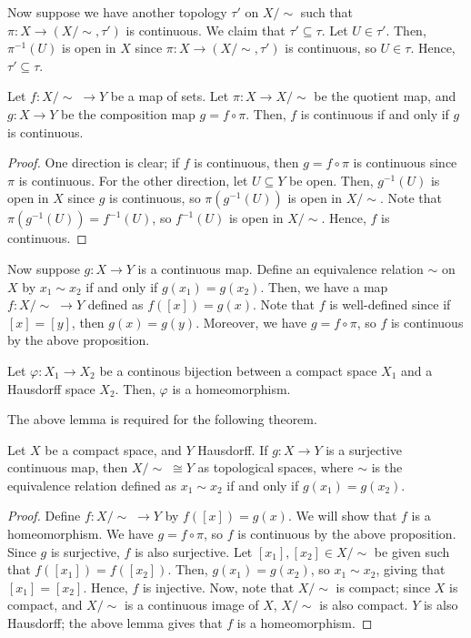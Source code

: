 Now suppose we have another topology $\tau'$ on $X/\!\sim$ such that $\pi : X \to (X/\!\sim,\tau')$ is continuous. We claim that $\tau' \subseteq \tau$. Let $U \in \tau'$. Then, $\pi^{-1}(U)$ is open in $X$ since $\pi : X \to (X/\!\sim,\tau')$ is continuous, so $U \in \tau$. Hence, $\tau' \subseteq \tau$.

\begin{proposition}
    Let $f : X/\!\sim\; \to Y$ be a map of sets. Let $\pi : X \to X/\!\sim$ be the quotient map, and $g:X \to Y$ be the composition map $g = f \circ \pi$. Then, $f$ is continuous if and only if $g$ is continuous.
\end{proposition}
\begin{proof}
    One direction is clear; if $f$ is continuous, then $g = f \circ \pi$ is continuous since $\pi$ is continuous. For the other direction, let $U \subseteq Y$ be open. Then, $g^{-1}(U)$ is open in $X$ since $g$ is continuous, so $\pi(g^{-1}(U))$ is open in $X/\!\sim$. Note that $\pi(g^{-1}(U)) = f^{-1}(U)$, so $f^{-1}(U)$ is open in $X/\!\sim$. Hence, $f$ is continuous.
\end{proof}

Now suppose $g:X \to Y$ is a continuous map. Define an equivalence relation $\sim$ on $X$ by $x_{1}\sim x_{2}$ if and only if $g(x_{1}) = g(x_{2})$. Then, we have a map $f : X/\!\sim \; \to Y$ defined as $f([x]) = g(x)$. Note that $f$ is well-defined since if $[x] = [y]$, then $g(x) = g(y)$. Moreover, we have $g = f \circ \pi$, so $f$ is continuous by the above proposition.


\begin{lemma}
    Let $\varphi:X_{1} \to X_{2}$ be a continous bijection between a compact space $X_{1}$ and a Hausdorff space $X_{2}$. Then, $\varphi$ is a homeomorphism.
\end{lemma}

The above lemma is required for the following theorem.

\begin{theorem}
    Let $X$ be a compact space, and $Y$ Hausdorff. If $g:X \to Y$ is a surjective continuous map, then $X/\!\sim \; \cong Y$ as topological spaces, where $\sim$ is the equivalence relation defined as $x_{1} \sim x_{2}$ if and only if $g(x_{1}) = g(x_{2})$.
\end{theorem}

\begin{proof}
    Define $f:X/\!\sim \; \to Y$ by $f([x]) = g(x)$. We will show that $f$ is a homeomorphism. We have $g = f \circ \pi$, so $f$ is continuous by the above proposition. Since $g$ is surjective, $f$ is also surjective. Let $[x_{1}],[x_{2}] \in X/\!\sim$ be given such that $f([x_{1}]) = f([x_{2}])$. Then, $g(x_{1}) = g(x_{2})$, so $x_{1} \sim x_{2}$, giving that $[x_{1}] = [x_{2}]$. Hence, $f$ is injective. Now, note that $X/\!\sim$ is compact; since $X$ is compact, and $X/\!\sim$ is a continuous image of $X$, $X/\!\sim$ is also compact. $Y$ is also Hausdorff; the above lemma gives that $f$ is a homeomorphism.
\end{proof}

